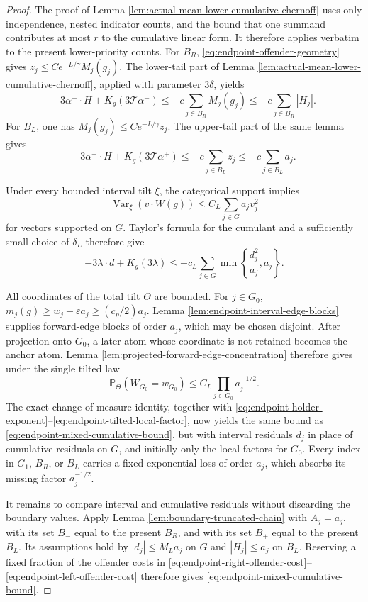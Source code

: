 \documentclass[11pt]{article}
\theoremstyle{remark}
\newcommand{\Pp}{\mathbb P}
\newcommand{\Var}{\operatorname{Var}}
\begin{document}
\begin{proof}
The proof of Lemma
\ref{lem:actual-mean-lower-cumulative-chernoff} uses only independence,
nested indicator counts, and the bound that one summand contributes at most
\(r\) to the cumulative linear form.  It therefore applies verbatim to the
present lower-priority counts.  For \(B_R\),
\eqref{eq:endpoint-offender-geometry} gives
\(z_j\le Ce^{-L/\gamma}M_j(g_j)\).  The lower-tail part of Lemma
\ref{lem:actual-mean-lower-cumulative-chernoff}, applied with parameter
\(3\delta\), yields
\[
        -3\alpha^-\cdot H+K_g(3\mathcal T\alpha^-)
        \le-c\sum_{j\in B_R}M_j(g_j)
        \le-c\sum_{j\in B_R}|H_j|.
\tag{8.22}\label{eq:endpoint-right-offender-cost}
\]
For \(B_L\), one has
\(M_j(g_j)\le Ce^{-L/\gamma}z_j\).  The upper-tail part of the same lemma
gives
\[
        -3\alpha^+\cdot H+K_g(3\mathcal T\alpha^+)
        \le-c\sum_{j\in B_L}z_j
        \le-c\sum_{j\in B_L}a_j.
\tag{8.23}\label{eq:endpoint-left-offender-cost}
\]

Under every bounded interval tilt \(\xi\), the categorical support implies
\[
        \Var_\xi(v\cdot W(g))
        \le C_L\sum_{j\in G}a_jv_j^2
\]
for vectors supported on \(G\).  Taylor's formula for the cumulant and a
sufficiently small choice of \(\delta_L\) therefore give
\[
        -3\lambda\cdot d+K_g(3\lambda)
        \le-c_L\sum_{j\in G}
        \min\left\{\frac{d_j^2}{a_j},a_j\right\}.
\tag{8.24}\label{eq:endpoint-local-tilt-cost}
\]

All coordinates of the total tilt \(\Theta\) are bounded.  For
\(j\in G_0\),
\(m_j(g)\ge w_j-\varepsilon a_j\ge(c_\eta/2)a_j\).
Lemma \ref{lem:endpoint-interval-edge-blocks} supplies forward-edge blocks of
order \(a_j\), which may be chosen disjoint.  After projection onto
\(G_0\), a later atom whose coordinate is not retained becomes the anchor
atom.  Lemma \ref{lem:projected-forward-edge-concentration} therefore gives
under the single tilted law
\[
        \Pp_\Theta(W_{G_0}=w_{G_0})
        \le C_L\prod_{j\in G_0}a_j^{-1/2}.
\tag{8.25}\label{eq:endpoint-tilted-local-factor}
\]
The exact change-of-measure identity, together with
\eqref{eq:endpoint-holder-exponent}--\eqref{eq:endpoint-tilted-local-factor},
now yields the same bound as \eqref{eq:endpoint-mixed-cumulative-bound}, but
with interval residuals \(d_j\) in place of cumulative residuals on \(G\),
and initially only the local factors for \(G_0\).  Every index in \(G_1\),
\(B_R\), or \(B_L\) carries a fixed exponential loss of order \(a_j\), which
absorbs its missing factor \(a_j^{-1/2}\).

It remains to compare interval and cumulative residuals without discarding the
boundary values.  Apply Lemma \ref{lem:boundary-truncated-chain} with
\(A_j=a_j\), with its set \(B_-\) equal to the present \(B_R\), and with its
set \(B_+\) equal to the present \(B_L\).  Its assumptions hold by
\(|d_j|\le M_La_j\) on \(G\) and \(|H_j|\le a_j\) on \(B_L\).  Reserving a
fixed fraction of the offender costs in
\eqref{eq:endpoint-right-offender-cost}--\eqref{eq:endpoint-left-offender-cost}
therefore gives \eqref{eq:endpoint-mixed-cumulative-bound}.


\end{proof}
\end{document}

